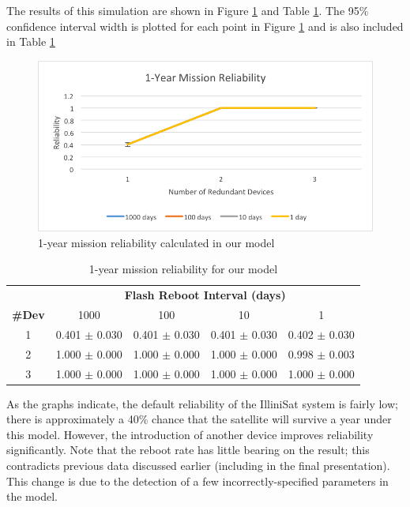 The results of this simulation are shown in Figure \ref{fig:reliability} and Table \ref{tab:reliability}.  The 95\% confidence interval width is plotted for each point in Figure \ref{fig:reliability} and is also included in Table \ref{tab:reliability}

\begin{figure}[width = 0.5\textwidth]
\centering
\includegraphics[scale=0.6]{reliability}
\caption{1-year mission reliability calculated in our model}\label{fig:reliability}
\end{figure}

\begin{table}[width = 0.5\textwidth]
{\scriptsize
\centering
\begin{tabular}{ccccc}
\toprule
& \multicolumn{4}{c}{\bf Flash Reboot Interval (days)}\\
\cmidrule(r){2-5}
{\bf \#Dev} & 1000 & 100 & 10 & 1\\
\midrule
1 & 0.401 $\pm$ 0.030 & 0.401 $\pm$ 0.030 & 0.401 $\pm$ 0.030 & 0.402 $\pm$ 0.030 \\
2 & 1.000 $\pm$ 0.000 & 1.000 $\pm$ 0.000 & 1.000 $\pm$ 0.000 & 0.998 $\pm$ 0.003 \\
3 & 1.000 $\pm$ 0.000 & 1.000 $\pm$ 0.000 & 1.000 $\pm$ 0.000 & 1.000 $\pm$ 0.000 \\
\bottomrule
\end{tabular}
\caption{1-year mission reliability for our model}\label{tab:reliability}
}
\end{table}

As the graphs indicate, the default reliability of the IlliniSat system is fairly low; there is approximately a 40\% chance that the satellite will survive a year under this model.  However, the introduction of another device improves reliability significantly.  Note that the reboot rate has little bearing on the result; this contradicts previous data discussed earlier (including in the final presentation).  This change is due to the detection of a few incorrectly-specified parameters in the model.


